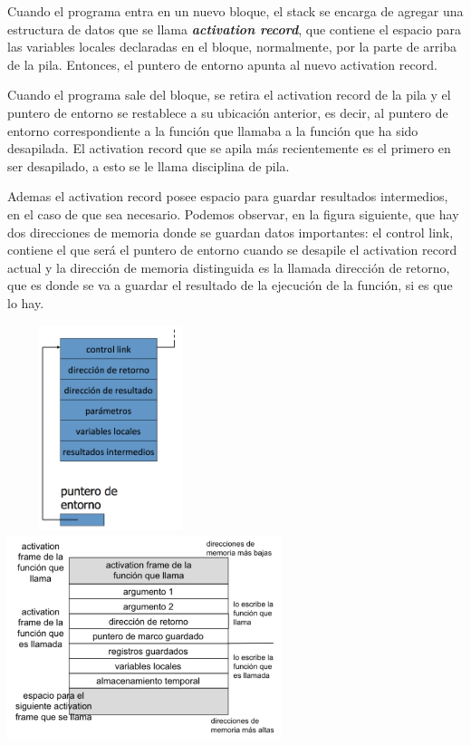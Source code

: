 \documentclass[10pt,a4paper]{report}
\begin{document}
\par Cuando el programa entra en un nuevo bloque, el stack se encarga de agregar una estructura de datos que se llama \textbf{\textit{activation record}}, que contiene el espacio para las variables locales declaradas en el bloque, normalmente, por la parte de arriba de la pila. Entonces, el puntero de entorno apunta al nuevo activation record.

\par Cuando el programa sale del bloque, se retira el activation record de la pila y el puntero de entorno se restablece a su ubicación anterior, es decir, al puntero de entorno correspondiente a la función que llamaba a la función que ha sido desapilada. El activation record que se apila más recientemente es el primero en ser desapilado, a esto se le llama disciplina de pila.

\par Ademas el activation record posee espacio para guardar resultados intermedios, en el caso de que sea necesario. Podemos observar, en la figura siguiente, que hay dos direcciones de memoria donde se guardan datos importantes: el control link, contiene el que será el puntero de entorno cuando se desapile el activation record actual y la dirección de memoria distinguida es la llamada dirección de retorno, que es donde se va a guardar el resultado de la ejecución de la función, si es que lo hay.

\begin{center} 
        \includegraphics[width=6cm, height=6cm]{funcion.png}        
        \includegraphics[width=8cm, height=6cm]{memoria.png}
\end{center}
\end{document}
